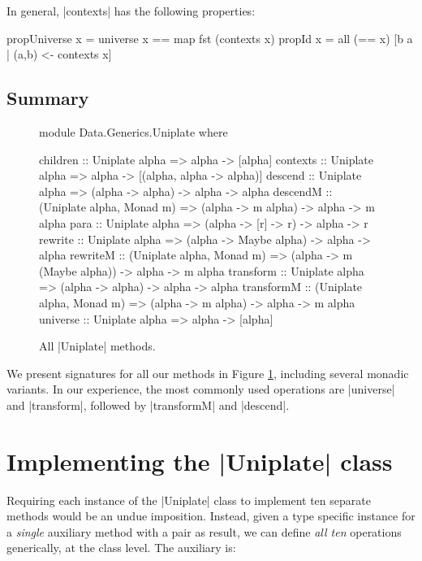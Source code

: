 In general, |contexts| has the following properties:

\begin{code}
propUniverse  x = universe x == map fst (contexts x)
propId        x = all (== x) [b a | (a,b) <- contexts x]
\end{code}



\subsection{Summary}

\begin{figure}
\begin{code}
module Data.Generics.Uniplate where

children    :: Uniplate alpha => alpha -> [alpha]
contexts    :: Uniplate alpha => alpha -> [(alpha, alpha -> alpha)]
descend     :: Uniplate alpha => (alpha -> alpha) -> alpha -> alpha
descendM    :: (Uniplate alpha, Monad m) =>
                  (alpha -> m alpha) -> alpha -> m alpha
para        :: Uniplate alpha => (alpha -> [r] -> r) -> alpha -> r
rewrite     :: Uniplate alpha => (alpha -> Maybe alpha) -> alpha -> alpha
rewriteM    :: (Uniplate alpha, Monad m)  =>
                  (alpha -> m (Maybe alpha)) -> alpha -> m alpha
transform   :: Uniplate alpha => (alpha -> alpha) -> alpha -> alpha
transformM  :: (Uniplate alpha, Monad m) =>
                  (alpha -> m alpha) -> alpha -> m alpha
universe    :: Uniplate alpha => alpha -> [alpha]
\end{code}
\caption{All |Uniplate| methods.}
\label{fig:play}
\end{figure}

We present signatures for all our methods in Figure \ref{fig:play}, including several monadic variants. In our experience, the most commonly used operations are |universe| and |transform|, followed by |transformM| and |descend|.


\section{Implementing the |Uniplate| class}
\label{sec:implement_play}

Requiring each instance of the |Uniplate| class to implement ten separate methods would be an undue imposition. Instead, given a type specific instance for a \textit{single} auxiliary method with a pair as result, we can define \textit{all ten} operations generically, at the class level. The auxiliary is:

